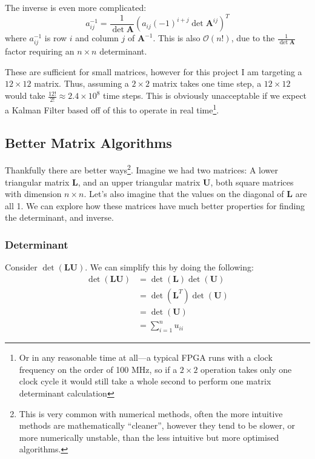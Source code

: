 \documentclass[12pt]{article}
\begin{document}
The inverse is even more complicated:
\begin{equation}
	a^{-1}_{ij} = \frac{1}{\det{\mathbf{A}}} \left(a_{ij} (-1)^{i+j} \det{\mathbf{A}^{ij}}\right)^T
\end{equation}
\noindent
where $a^{-1}_{ij}$ is row $i$ and column $j$ of $\mathbf{A}^{-1}$. This is also $\mathcal{O}(n!)$, due to the $\frac{1}{\det{\mathbf{A}}}$ factor requiring an $n \times n$ determinant.

These are sufficient for small matrices, however for this project I am targeting a $12 \times 12$ matrix. Thus, assuming a $2\times2$ matrix takes one time step, a $12 \times 12$ would take $\frac{12!}{2!} \approx 2.4 \times 10^8$ time steps. This is obviously unacceptable if we expect a Kalman Filter based off of this to operate in real time\footnote{Or in any reasonable time at all---a typical FPGA runs with a clock frequency on the order of 100 MHz, so if a $2\times2$ operation takes only one clock cycle it would still take a whole second to perform one matrix determinant calculation}.

\subsection{Better Matrix Algorithms}
\label{lu}


Thankfully there are better ways\footnote{This is very common with numerical methods, often the more intuitive methods are mathematically ``cleaner'', however they tend to be slower, or more numerically unstable, than the less intuitive but more optimised algorithms.}. Imagine we had two matrices: A lower triangular matrix $\mathbf{L}$, and an upper triangular matrix $\mathbf{U}$, both square matrices with dimension $n \times n$. Let's also imagine that the values on the diagonal of $\mathbf{L}$ are all 1. We can explore how these matrices have much better properties for finding the determinant, and inverse.

\subsubsection{Determinant}
Consider $\det(\mathbf{LU})$. We can simplify this by doing the following:
\begin{align}
	\det(\mathbf{LU}) &= \det(\mathbf{L}) \det(\mathbf{U}) \label{lu_det_1} \\
	&= \det(\mathbf{L}^T) \det(\mathbf{U}) \label{lu_det_2} \\
	&= \det(\mathbf{U}) \label{lu_det_3} \\
	&= \sum_{i=1}^{n} u_{ii} \label{lu_det_4}
\end{align}
\end{document}
